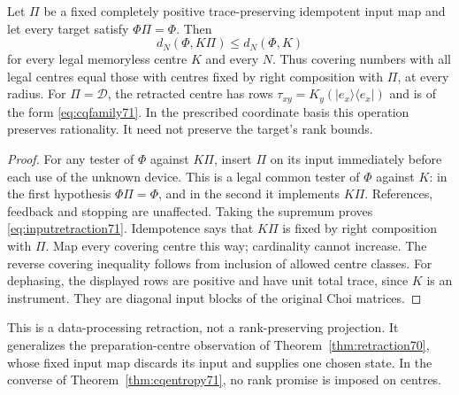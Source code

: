 \begin{proposition}\label{prop:inputretraction71}
Let $\Pi$ be a fixed completely positive trace-preserving idempotent
input map and let every target satisfy $\Phi\Pi=\Phi$. Then
\begin{equation}\label{eq:inputretraction71}
             d_N(\Phi,K\Pi)\le d_N(\Phi,K)
\end{equation}
for every legal memoryless centre $K$ and every $N$. Thus covering
numbers with all legal centres equal those with centres fixed by
right composition with $\Pi$, at every radius.
For $\Pi=\mathcal D$, the retracted centre has rows
$\tau_{xy}=K_y(|e_x\rangle\langle e_x|)$ and is of the form
\eqref{eq:cqfamily71}. In the prescribed coordinate basis this operation
preserves rationality. It need not preserve the target's rank bounds.
\end{proposition}
\begin{proof}
For any tester of $\Phi$ against $K\Pi$, insert $\Pi$ on its input
immediately before each use of the unknown device. This is a legal
common tester of $\Phi$ against $K$: in the first hypothesis
$\Phi\Pi=\Phi$, and in the second it implements $K\Pi$. References,
feedback and stopping are unaffected. Taking the supremum proves
\eqref{eq:inputretraction71}. Idempotence says that $K\Pi$ is fixed
by right composition with $\Pi$. Map every covering centre this way;
cardinality cannot increase. The reverse covering inequality follows
from inclusion of allowed centre classes. For dephasing, the displayed
rows are positive and have unit total trace, since $K$ is an instrument.
They are diagonal input blocks of the original Choi matrices.
\end{proof}
This is a data-processing retraction, not a rank-preserving projection.
It generalizes the preparation-centre observation of
Theorem~\ref{thm:retraction70}, whose fixed input map discards its input
and supplies one chosen state. In the converse of
Theorem~\ref{thm:cqentropy71}, no rank promise is imposed on centres.

